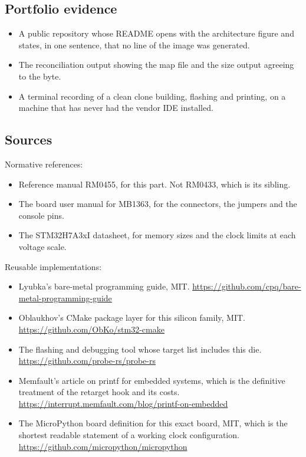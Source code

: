 \subsection*{Portfolio evidence}

\begin{itemize}
\item A public repository whose README opens with the architecture figure and
states, in one sentence, that no line of the image was generated.
\item The reconciliation output showing the map file and the size output
agreeing to the byte.
\item A terminal recording of a clean clone building, flashing and printing, on
a machine that has never had the vendor IDE installed.
\end{itemize}

\subsection*{Sources}

Normative references:
\begin{itemize}
\item Reference manual RM0455, for this part. Not RM0433, which is its sibling.
\item The board user manual for MB1363, for the connectors, the jumpers and the
console pins.
\item The STM32H7A3xI datasheet, for memory sizes and the clock limits at each
voltage scale.
\end{itemize}

Reusable implementations:
\begin{itemize}
\item Lyubka's bare-metal programming guide, MIT.\newline
\url{https://github.com/cpq/bare-metal-programming-guide}
\item Oblaukhov's CMake package layer for this silicon family, MIT.\newline
\url{https://github.com/ObKo/stm32-cmake}
\item The flashing and debugging tool whose target list includes this die.\newline
\url{https://github.com/probe-rs/probe-rs}
\item Memfault's article on printf for embedded systems, which is the definitive
treatment of the retarget hook and its costs.\newline
\url{https://interrupt.memfault.com/blog/printf-on-embedded}
\item The MicroPython board definition for this exact board, MIT, which is the
shortest readable statement of a working clock configuration.\newline
\url{https://github.com/micropython/micropython}
\end{itemize}
